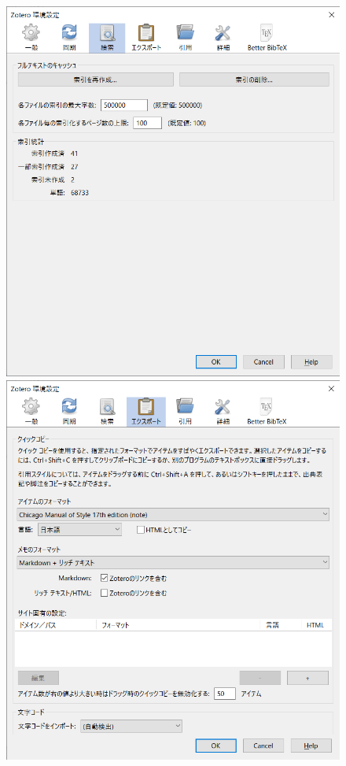 \documentclass[a4paper,pdftex]{article}
\begin{document}
\begin{figure}[ht]
\begin{minipage}[ht]{0.19\columnwidth}
  \end{minipage}
  \begin{minipage}[ht]{0.19\columnwidth}
    \centering
    \includegraphics[width=\columnwidth]{fig/zotero03.png}
  \end{minipage}
  \begin{minipage}[ht]{0.19\columnwidth}
    \centering
    \includegraphics[width=\columnwidth]{fig/zotero04.png}

\end{minipage}
\end{figure}
\end{document}
